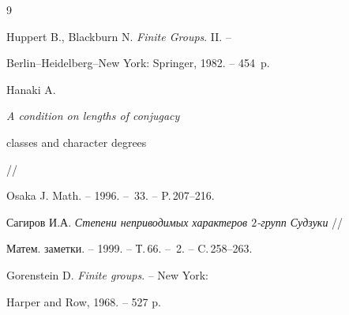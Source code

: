 \begin{thebibliography}{9}







Huppert B., Blackburn N. {\em Finite Groups}. II. --


Berlin--Heidelberg--New York: Springer, 1982. -- 454~p.




Hanaki A. {\em A condition on lengths of conjugacy 


classes and character degrees} //


Osaka J. Math. -- 1996. -- \No\,33. -- P.\,207--216.




Сагиров И.А. {\em Степени неприводимых характеров $2$-групп Судзуки} //


Матем. заметки. -- 1999. -- Т.\,66. -- \No\,2. -- C.\,258--263.




Gorenstein D. {\em Finite groups}. -- New York: 


Harper and Row, 1968. -- 527 p.








\end{thebibliography}





\vskip 2cm














\label{end}





